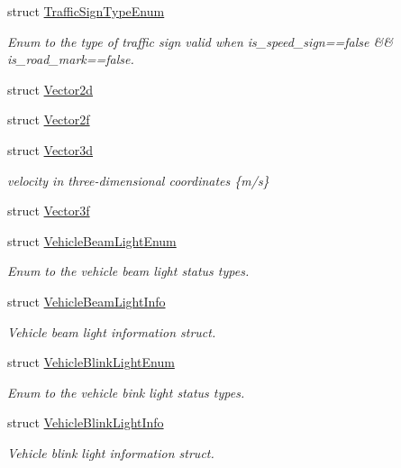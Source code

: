 \begin{DoxyCompactItemize}
struct \hyperlink{structmaf__perception__interface_1_1TrafficSignTypeEnum}{Traffic\+Sign\+Type\+Enum}
\begin{DoxyCompactList}\small\item\em Enum to the type of traffic sign  valid when is\+\_\+speed\+\_\+sign==false \&\& is\+\_\+road\+\_\+mark==false. \end{DoxyCompactList}\item 
struct \hyperlink{structmaf__perception__interface_1_1Vector2d}{Vector2d}
\item 
struct \hyperlink{structmaf__perception__interface_1_1Vector2f}{Vector2f}
\item 
struct \hyperlink{structmaf__perception__interface_1_1Vector3d}{Vector3d}
\begin{DoxyCompactList}\small\item\em velocity in three-\/dimensional coordinates \{m/s\} \end{DoxyCompactList}\item 
struct \hyperlink{structmaf__perception__interface_1_1Vector3f}{Vector3f}
\item 
struct \hyperlink{structmaf__perception__interface_1_1VehicleBeamLightEnum}{Vehicle\+Beam\+Light\+Enum}
\begin{DoxyCompactList}\small\item\em Enum to the vehicle beam light status types. \end{DoxyCompactList}\item 
struct \hyperlink{structmaf__perception__interface_1_1VehicleBeamLightInfo}{Vehicle\+Beam\+Light\+Info}
\begin{DoxyCompactList}\small\item\em Vehicle beam light information struct. \end{DoxyCompactList}\item 
struct \hyperlink{structmaf__perception__interface_1_1VehicleBlinkLightEnum}{Vehicle\+Blink\+Light\+Enum}
\begin{DoxyCompactList}\small\item\em Enum to the vehicle bink light status types. \end{DoxyCompactList}\item 
struct \hyperlink{structmaf__perception__interface_1_1VehicleBlinkLightInfo}{Vehicle\+Blink\+Light\+Info}
\begin{DoxyCompactList}\small\item\em Vehicle blink light information struct. \end{DoxyCompactList}\item 

\end{DoxyCompactItemize}
